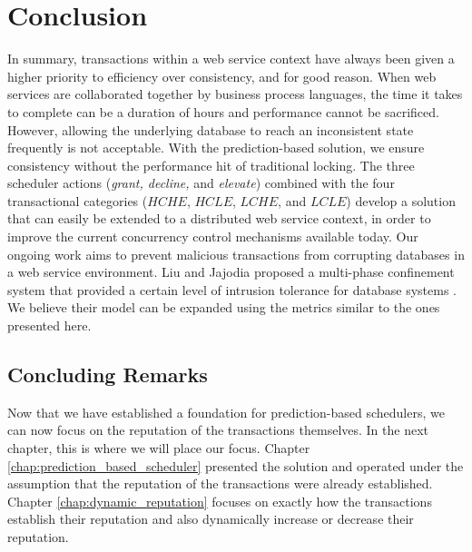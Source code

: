 \section{Conclusion}
\label{pbs:conclusion}
In summary, transactions within a web service context have always been given a higher priority to efficiency over consistency, and for good reason. When web services are collaborated together by business process languages, the time it takes to complete can be a duration of hours and performance cannot be sacrificed. However, allowing the underlying database to reach an inconsistent state frequently is not acceptable. With the prediction-based solution, we ensure consistency without the performance hit of traditional locking. The three scheduler actions (\textit{grant, decline,} and \textit{elevate}) combined with the four transactional categories ($HCHE$, $HCLE$, $LCHE$, and $LCLE$) develop a solution that can easily be extended to a distributed web service context, in order to improve the current concurrency control mechanisms available today. Our ongoing work aims to prevent malicious transactions from corrupting databases in a web service environment. Liu and Jajodia proposed a multi-phase confinement system that provided a certain level of intrusion tolerance for database systems \cite{Liu_Intrusion}. We believe their model can be expanded using the metrics similar to the ones presented here.

\subsection{Concluding Remarks}
Now that we have established a foundation for prediction-based schedulers, we can now focus on the reputation of the transactions themselves. In the next chapter, this is where we will place our focus. Chapter \ref{chap:prediction_based_scheduler} presented the solution and operated under the assumption that the reputation of the transactions were already established. Chapter \ref{chap:dynamic_reputation} focuses on exactly how the transactions establish their reputation and also dynamically increase or decrease their reputation.

